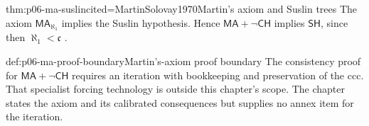 \begin{hbtheorem}{thm:p06-ma-suslin}{cited=MartinSolovay1970}{Martin's axiom and Suslin trees}
The axiom \(\mathsf{MA}_{\aleph_1}\) implies the Suslin hypothesis.  Hence
\(\mathsf{MA}+\neg\mathsf{CH}\) implies \(\mathsf{SH}\), since then
\(\aleph_1<\mathfrak c\) \cite{MartinSolovay1970,Jech2003}.
\end{hbtheorem}

\begin{proofboundary}{def:p06-ma-proof-boundary}{Martin's-axiom proof boundary}
The consistency proof for \(\mathsf{MA}+\neg\mathsf{CH}\) requires an
iteration with bookkeeping and preservation of the ccc.  That specialist
forcing technology is outside this chapter's scope.  The chapter states
the axiom and its calibrated consequences but supplies no annex item for the
iteration.
\end{proofboundary}

